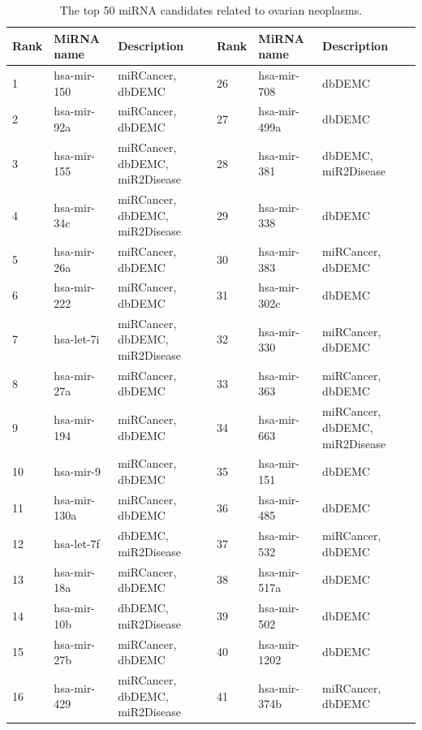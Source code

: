 \documentclass[journal,twoside,web]{ieeecolor}
\begin{document}
\begin{table}[tb]
	\centering
		\begin{threeparttable}[b]	
		\caption{The top 50 miRNA candidates related to ovarian  neoplasms.}
		\setlength{\tabcolsep}{0mm}	
         \label{tab:03}
		\begin{tabular}{p{1.5cm}<{\centering} p{2.5cm}<{\raggedright} p{4.5cm}<{\raggedright} | p{1.5cm}<{\centering}   p{2.5cm}<{\raggedright} p{4.5cm}<{\raggedright}}
            \hline
            Rank &  MiRNA name & Description & Rank & MiRNA name & Description\\
			\hline
            1 &	hsa-mir-150 & miRCancer, dbDEMC & 26	 & hsa-mir-708 & dbDEMC\\
            2 &	hsa-mir-92a & miRCancer, dbDEMC & 27	 & hsa-mir-499a & dbDEMC\\
            3 & hsa-mir-155 & miRCancer, dbDEMC, miR2Disease & 28 & hsa-mir-381 & dbDEMC, miR2Disease\\
            4 & hsa-mir-34c & miRCancer, dbDEMC, miR2Disease & 29 & hsa-mir-338 & dbDEMC\\
            5 &	hsa-mir-26a & miRCancer, dbDEMC & 30	 & hsa-mir-383 & miRCancer, dbDEMC\\
            6 &	hsa-mir-222 & miRCancer, dbDEMC & 31	 & hsa-mir-302c	 & dbDEMC\\
            7 &	hsa-let-7i & miRCancer, dbDEMC, miR2Disease & 32 & hsa-mir-330 & miRCancer, dbDEMC\\
            8 &	hsa-mir-27a & miRCancer, dbDEMC & 33	 & hsa-mir-363 & miRCancer, dbDEMC\\
            9 &	hsa-mir-194 & miRCancer, dbDEMC & 34	 & hsa-mir-663 & miRCancer, dbDEMC, miR2Disease\\
            10 & hsa-mir-9 & miRCancer, dbDEMC & 35	 & hsa-mir-151	 & dbDEMC\\
            11 & hsa-mir-130a &	miRCancer, dbDEMC & 36	 & hsa-mir-485	 & dbDEMC\\
            12 & hsa-let-7f & dbDEMC, miR2Disease & 37 & hsa-mir-532	 & miRCancer, dbDEMC\\
            13 & hsa-mir-18a & miRCancer, dbDEMC	& 38 & hsa-mir-517a	 & dbDEMC\\
            14 & hsa-mir-10b & dbDEMC, miR2Disease & 39	 & hsa-mir-502	 & dbDEMC\\
            15 & hsa-mir-27b & miRCancer, dbDEMC & 40 & hsa-mir-1202	 & dbDEMC\\
            16 & hsa-mir-429 & miRCancer, dbDEMC, miR2Disease & 41 & hsa-mir-374b & miRCancer, dbDEMC\\

\end{tabular}
\end{threeparttable}
\end{table}
\end{document}
